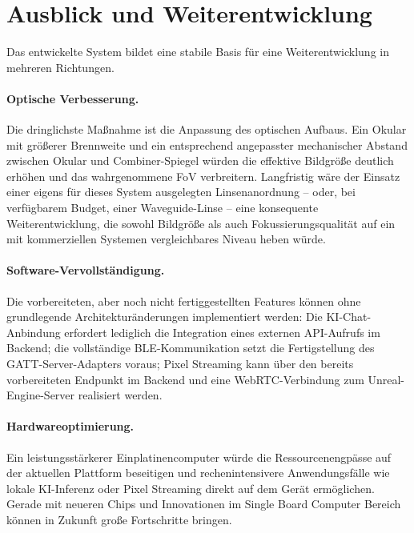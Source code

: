 \section{Ausblick und Weiterentwicklung}
\label{sec:AusblickUndWeiterentwicklung}

Das entwickelte System bildet eine stabile Basis für eine Weiterentwicklung
in mehreren Richtungen.

\paragraph{Optische Verbesserung.}
Die dringlichste Maßnahme ist die Anpassung des optischen Aufbaus.
Ein Okular mit größerer Brennweite und ein entsprechend angepasster mechanischer
Abstand zwischen Okular und Combiner-Spiegel würden die effektive Bildgröße
deutlich erhöhen und das wahrgenommene FoV verbreitern.
Langfristig wäre der Einsatz einer eigens für dieses System ausgelegten
Linsenanordnung -- oder, bei verfügbarem Budget, einer Waveguide-Linse --
eine konsequente Weiterentwicklung, die sowohl Bildgröße als auch
Fokussierungsqualität auf ein mit kommerziellen Systemen vergleichbares
Niveau heben würde.

\paragraph{Software-Vervollständigung.}
Die vorbereiteten, aber noch nicht fertiggestellten Features können ohne
grundlegende Architekturänderungen implementiert werden:
Die KI-Chat-Anbindung erfordert lediglich die Integration eines externen
API-Aufrufs im Backend;
die vollständige BLE-Kommunikation setzt die Fertigstellung des
GATT-Server-Adapters voraus;
Pixel Streaming kann über den bereits vorbereiteten Endpunkt im Backend
und eine WebRTC-Verbindung zum Unreal-Engine-Server realisiert werden.
\newpage
\paragraph{Hardwareoptimierung.}
Ein leistungsstärkerer Einplatinencomputer würde die Ressourcenengpässe auf der
aktuellen Plattform beseitigen und rechenintensivere Anwendungsfälle wie
lokale KI-Inferenz oder Pixel Streaming direkt auf dem Gerät ermöglichen. Gerade mit neueren Chips und Innovationen im Single Board Computer Bereich können in Zukunft große Fortschritte bringen.

